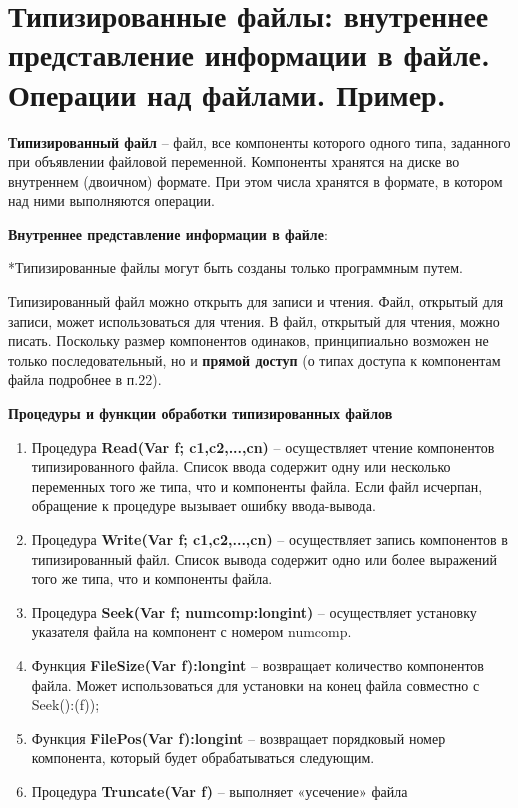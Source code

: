 



\newpage\section{Типизированные  файлы:  внутреннее  представление  информации  в  файле.  Операции  над 
файлами. Пример. }

\begin{myquote}
            
\end{myquote}

{\bf Типизированный файл} – файл, все компоненты которого одного типа, заданного при объявлении файловой переменной. 
Компоненты хранятся на диске во внутреннем (двоичном) формате. При этом числа хранятся в формате, в котором над ними выполняются операции. 

{\bf{Внутреннее  представление  информации  в  файле}}:

*Типизированные файлы могут быть созданы только программным путем.

Типизированный файл можно открыть для записи и чтения. Файл, открытый для записи, может использоваться для чтения. В файл, открытый для чтения, можно писать.  
Поскольку размер компонентов одинаков, принципиально возможен не только последовательный, но и {\bf{прямой доступ}} (о типах доступа к компонентам файла подробнее в п.22). 

{\bf Процедуры и функции обработки типизированных файлов}

\begin{enumerate}
\item Процедура {\bf Read(Var f; c1,c2,...,cn)} – осуществляет чтение компонентов типизированного файла. Список ввода содержит одну или несколько переменных того же типа, что и компоненты файла. Если файл исчерпан, обращение к процедуре вызывает ошибку ввода-вывода.

\item Процедура {\bf Write(Var f; c1,c2,...,cn)} – осуществляет запись компонентов в типизированный файл.  Список вывода содержит одно или более выражений того же типа, что и компоненты файла.

\item Процедура {\bf Seek(Var f; numcomp:longint)} – осуществляет установку указателя файла на компонент с номером numcomp.

\item Функция {\bf FileSize(Var f):longint} – возвращает количество компонентов файла. Может использоваться для установки на конец файла совместно с Seek():(f));

\item Функция {\bf FilePos(Var f):longint} –  возвращает порядковый номер компонента, который будет обрабатываться следующим.

\item  Процедура {\bf Truncate(Var f)} – выполняет «усечение» файла
\end{enumerate}

